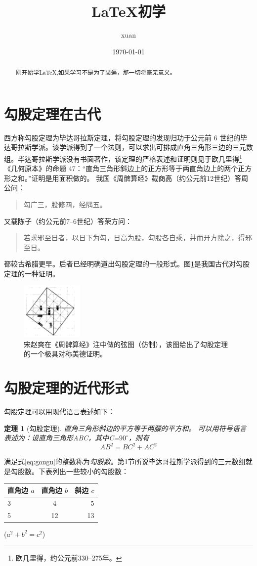 \documentclass[UTF8]{ctexart}
\title{\heiti \LaTeX 初学}
\author{\kaishu xuan}
\date{\today}
\newtheorem{thm}{定理}
\begin{document}
\maketitle
\newenvironment{myquote}{\begin{quote}\kaishu\zihao{-5}}{\end{quote}}
\newcommand{\degree}{^\circ}


\begin{abstract}
刚开始学\LaTeX,如果学习不是为了装逼，那一切将毫无意义。
\end{abstract}
\tableofcontents
\section{勾股定理在古代}
西方称勾股定理为毕达哥拉斯定理，将勾股定理的发现归功于公元前 6 世纪的毕达哥拉斯学派\cite{Kline}。该学派得到了一个法则，可以求出可排成直角三角形三边的三元数组。毕达哥拉斯学派没有书面著作，该定理的严格表述和证明则见于欧几里得\footnote{欧几里得，约公元前330--275年。}《几何原本》的命题 47：“直角三角形斜边上的正方形等于两直角边上的两个正方形之和。”证明是用面积做的。
我国《周髀算经》载商高（约公元前12世纪）答周公问：
\begin{myquote}
勾广三，股修四，经隅五。
\end{myquote}
又载陈子（约公元前7--6世纪）答荣方问：
\begin{myquote}
若求邪至日者，以日下为勾，日高为股，勾股各自乘，并而开方除之，得邪至日。
\end{myquote}
都较古希腊更早。后者已经明确道出勾股定理的一般形式。图\ref{fig:gougu}是我国古代对勾股定理的一种证明\cite{quanjing}。 
\begin{figure}[ht]
  \centering
  \includegraphics[width=3cm]{gougu.png}
  \caption {\kaishu{} 宋赵爽在《周髀算经》注中做的弦图（仿制），该图给出了勾股定理的一个极具对称美德证明。}
  \label{fig:gougu}
\end{figure}


\section{勾股定理的近代形式}
勾股定理可以用现代语言表述如下：
\begin{thm}[勾股定理]
直角三角形斜边的平方等于两腰的平方和。
可以用符号语言表述为：设直角三角形ABC，其中\angle C=$90\degree$，则有
\begin{equation} \label{eq:gougu}
AB^2 = BC^2 + AC^2
\end{equation}
\end{thm}

满足式\eqref{eq:gougu}的整数称为\emph{勾股数}。第1节所说毕达哥拉斯学派得到的三元数组就是勾股数。下表列出一些较小的勾股数：
\begin{table}[h]
\begin{tabular}{|lcr|}
\hline
直角边 $a$ & 直角边 $b$ & 斜边 $c$\\
\hline
3 &  4 & 5\\
5 &  12&  13\\
\hline
\end{tabular}%
\qquad
($a^2 + b^2 = c^2$)
\end{table}
\nocite{Shiye}

\end{document}
